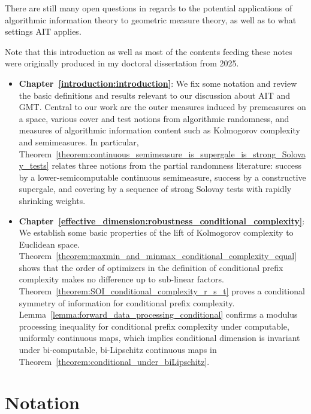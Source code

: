 There are still many open questions in regards to the potential applications of algorithmic information theory to geometric measure theory, as well as to what settings AIT applies. 

Note that this introduction as well as most of the contents feeding these notes were originally produced in my doctoral dissertation from 2025. 

\begin{itemize}
    \item \textbf{Chapter~\ref{introduction:introduction}}: We fix some notation and review the basic definitions and results relevant to our discussion about AIT and GMT. Central to our work are the outer measures induced by premeasures on a space, various cover and test notions from algorithmic randomness, and measures of algorithmic information content such as Kolmogorov complexity and semimeasures. In particular, Theorem~\ref{theorem:continuous_semimeasure_is_supergale_is_strong_Solovay_tests} relates three notions from the partial randomness literature: success by a lower-semicomputable continuous semimeasure, success by a constructive supergale, and covering by a sequence of strong Solovay tests with rapidly shrinking weights.
    \item \textbf{Chapter~\ref{effective_dimension:robustness_conditional_complexity}}: We establish some basic properties of the lift of Kolmogorov complexity to Euclidean space. Theorem~\ref{theorem:maxmin_and_minmax_conditional_complexity_equal} shows that the order of optimizers in the definition of conditional prefix complexity makes no difference up to sub-linear factors. Theorem~\ref{theorem:SOI_conditional_complexity_r_s_t} proves a conditional symmetry of information for conditional prefix complexity. Lemma~\ref{lemma:forward_data_processing_conditional} confirms a modulus processing inequality for conditional prefix complexity under computable, uniformly continuous maps, which implies conditional dimension is invariant under bi-computable, bi-Lipschitz continuous maps in Theorem~\ref{theorem:conditional_under_biLipschitz}.
\end{itemize}


\section{Notation} \label{section:Notation}


